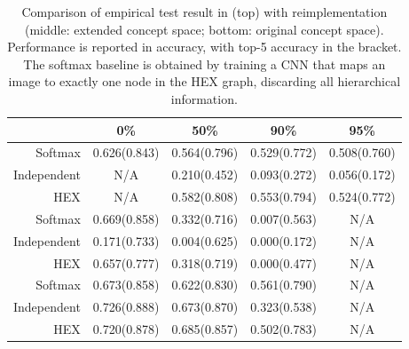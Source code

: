 \documentclass[11pt,a4paper]{article}
\begin{document}
\begin{table}[htbp]
\centering
\begin{tabular}{r|c|c|c|c}
 & 0\% & 50\% & 90\% & 95\%\\
\hline
Softmax & 0.626(0.843) & 0.564(0.796) & 0.529(0.772) & 0.508(0.760)\\
Independent & N/A & 0.210(0.452) & 0.093(0.272) & 0.056(0.172)\\
HEX & N/A & 0.582(0.808) & 0.553(0.794) & 0.524(0.772)\\
\hline
Softmax & 0.669(0.858) & 0.332(0.716) & 0.007(0.563) & N/A\\
Independent & 0.171(0.733) & 0.004(0.625) & 0.000(0.172) & N/A\\
HEX & 0.657(0.777) & 0.318(0.719) & 0.000(0.477) & N/A\\
\hline
Softmax & 0.673(0.858) & 0.622(0.830) & 0.561(0.790) & N/A\\
Independent & 0.726(0.888) & 0.673(0.870) & 0.323(0.538) & N/A\\
HEX & 0.720(0.878) & 0.685(0.857) & 0.502(0.783) & N/A
\end{tabular}
\caption{Comparison of empirical test result in \cite{deng2014large} (top) with reimplementation (middle: extended concept space; bottom: original concept space). Performance is reported in accuracy, with top-5 accuracy in the bracket. The softmax baseline is obtained by training a CNN that maps an image to exactly one node in the HEX graph, discarding all hierarchical information.}
\label{tab:original}
\end{table}
\end{document}
